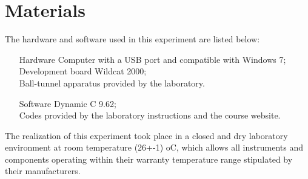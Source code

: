 \section{Materials}

The hardware and software used in this experiment are listed below:

\begin{enumerate}
\item[Hardware]
Computer with a USB port and compatible with Windows 7;
\\ Development board Wildcat 2000;
\\ Ball-tunnel apparatus provided by the laboratory.
\\
\item[Software]
Dynamic C 9.62;
\\ Codes provided by the laboratory instructions and the course website.
\\
\end{enumerate}

The realization of this experiment took place in a closed and dry laboratory environment at room temperature (26+-1)  oC, which allows all instruments and components operating within their warranty temperature range stipulated by their manufacturers.
